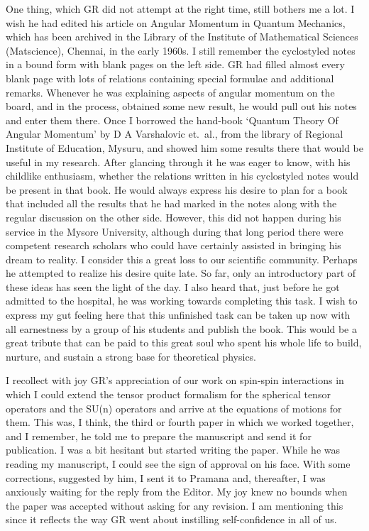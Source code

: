 One thing, which GR did not attempt at the right time, still bothers me a lot. I wish he had edited his article on Angular Momentum in Quantum Mechanics, which has been archived in the Library of the Institute of Mathematical Sciences (Matscience), Chennai, in the early 1960s. I still remember the cyclostyled notes in a bound form with blank pages on the left side. GR had filled almost every blank page with lots of relations containing special formulae and additional remarks. Whenever he was explaining aspects of angular momentum on the board, and in the process, obtained some new result, he would pull out his notes and enter them there. Once I borrowed the hand-book ‘Quantum Theory Of Angular Momentum' by D A Varshalovic et.\ al., from the library of Regional Institute of Education, Mysuru, and showed him some results there that would be useful in my research. After glancing through it he was eager to know, with his childlike enthusiasm, whether the relations written in his cyclostyled notes would be present in that book. He would always express his desire to plan for a book that included all the results that he had marked in the notes along with the regular discussion on the other side. However, this did not happen during his service in the Mysore University, although during that long period there were competent research scholars who could have certainly assisted in bringing his dream to reality. I consider this a great loss to our scientific community. Perhaps he attempted to realize his desire quite late. So far, only an introductory part of these ideas has seen the light of the day. I also heard that, just before he got admitted to the hospital, he was working towards completing this task. I wish to express my gut feeling here that this unfinished task can be taken up now with all earnestness by a group of his students and publish the book. This would be a great tribute that can be paid to this great soul who spent his whole life to build, nurture, and sustain a strong base for theoretical physics.

I recollect with joy GR's appreciation of our work on spin-spin interactions in which I could extend the tensor product formalism for the spherical tensor operators and the SU(n) operators and arrive at the equations of motions for them. This was, I think, the third or fourth paper in which we worked together, and I remember, he told me to prepare the manuscript and send it for publication. I was a bit hesitant but started writing the paper. While he was reading my manuscript, I could see the sign of approval on his face. With some corrections, suggested by him, I sent it to Pramana and, thereafter, I was anxiously waiting for the reply from the Editor. My joy knew no bounds when the paper was accepted without asking for any revision. I am mentioning this since it reflects the way GR went about instilling self-confidence in all of us.

